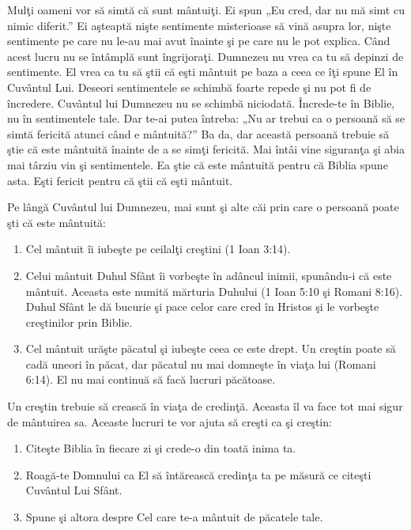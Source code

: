 Mulţi oameni vor să simtă că sunt mântuiţi. Ei spun „Eu cred, dar nu mă simt cu nimic diferit.” Ei aşteaptă nişte sentimente misterioase să vină asupra lor, nişte sentimente pe care nu le-au mai avut înainte şi pe care nu le pot explica. Când acest lucru nu se întâmplă sunt îngrijoraţi. Dumnezeu nu vrea ca tu să depinzi de sentimente. El vrea ca tu să ştii că eşti mântuit pe baza a ceea ce îţi spune El în Cuvântul Lui. Deseori sentimentele se schimbă foarte repede şi nu pot fi de încredere. Cuvântul lui Dumnezeu nu se schimbă niciodată. Încrede-te în Biblie, nu în sentimentele tale. Dar te-ai putea întreba: „Nu ar trebui ca o persoană să se simtă fericită atunci când e mântuită?” Ba da, dar această persoană trebuie să ştie că este mântuită înainte de a se simţi fericită. Mai întâi vine siguranţa şi abia mai târziu  vin şi sentimentele. Ea ştie că este mântuită pentru că Biblia spune asta. Eşti fericit pentru că ştii că eşti mântuit.

Pe lângă Cuvântul lui Dumnezeu, mai sunt şi alte căi prin care o persoană poate şti că este mântuită:

\begin{enumerate}

	\item Cel mântuit îi iubeşte pe ceilalţi creştini (1 Ioan 3:14).

	\item Celui mântuit Duhul Sfânt îi vorbeşte în adâncul inimii, spunându-i că este mântuit. Aceasta este numită mărturia Duhului (1 Ioan 5:10 şi Romani 8:16). Duhul Sfânt le dă bucurie şi pace celor care cred în Hristos şi le vorbeşte creştinilor prin Biblie.
	
	\item Cel mântuit urăşte păcatul şi iubeşte ceea ce este drept. Un creştin poate să cadă uneori în păcat, dar păcatul nu mai domneşte în viaţa lui (Romani 6:14). El nu mai continuă să facă lucruri păcătoase.
	
\end{enumerate}

Un creştin trebuie să crească în viaţa de credinţă. Aceasta îl va face tot mai sigur de mântuirea sa. Aceaste lucruri te vor ajuta să creşti ca şi creştin:

\begin{enumerate}

	\item Citeşte Biblia în fiecare zi şi crede-o din toată inima ta.
	
	\item Roagă-te Domnului ca El să întărească credinţa ta pe măsură ce citeşti Cuvântul Lui Sfânt.
	
	\item Spune şi altora despre Cel care te-a mântuit de păcatele tale.
	
\end{enumerate}


